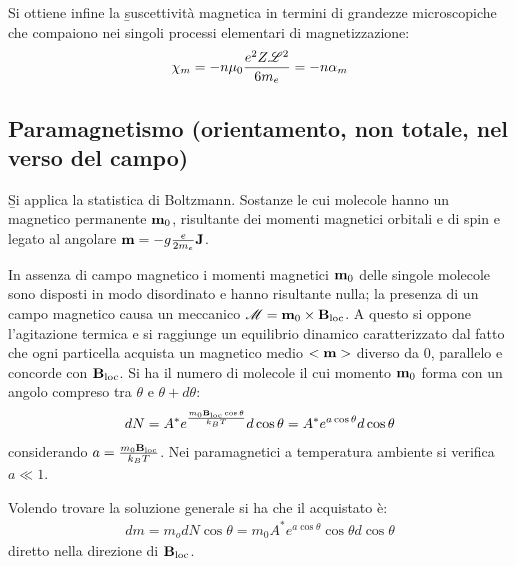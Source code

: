 Si ottiene infine la \b{suscettività magnetica in termini di grandezze microscopiche} che compaiono nei singoli processi elementari di magnetizzazione:
\begin{equation}\begin{split}
\chi_m=-n\mu_0\frac{e^2Z\mathcal{L}^2}{6m_e}=-n\alpha_m
\end{split}\end{equation}

\subsection{Paramagnetismo (orientamento, non totale, nel verso del campo)}
\b{Si applica la statistica di Boltzmann}. Sostanze le cui molecole hanno un \mom magnetico permanente $\mathbf{m}_0$, risultante dei momenti magnetici orbitali e di spin e legato al \mom angolare $\mathbf{m}=-g\frac{e}{2m_e}\mathbf{J}$.

In assenza di campo magnetico i momenti magnetici $\mathbf{m}_0$ delle singole molecole sono disposti in modo disordinato e hanno risultante nulla; la presenza di un campo magnetico causa un \mom meccanico $\mathcal{M}=\mathbf{m}_0\times\mathbf{B}_{\textrm{loc}}$. A questo si oppone l'agitazione termica e si raggiunge un equilibrio dinamico caratterizzato dal fatto che ogni particella acquista un \mom magnetico medio $<\mathbf{m}>$ diverso da 0, parallelo e concorde con $\mathbf{B}_{\textrm{loc}}$. Si ha il numero di molecole il cui momento $\mathbf{m}_0$ forma con \dBl un angolo compreso tra $\theta$ e $\theta+d\theta$:
\begin{equation}\begin{split}
dN=A^*e^{\frac{m_0\mathbf{B}_{\textrm{loc}}\cos{\theta}}{k_BT}}d\cos{\theta}=A^*e^{a\cos{\theta}}d\cos{\theta}
\end{split}\end{equation}
considerando $a=\frac{m_0\mathbf{B}_{\textrm{loc}}}{k_BT}$. Nei paramagnetici a temperatura ambiente si verifica $a\ll 1$.

Volendo trovare la soluzione generale si ha che il \mom acquistato è:
\begin{equation}\begin{split}
dm=m_odN\cos{\theta}=m_0A^*e^{a\cos{\theta}}\cos{\theta}d\cos{\theta}
\end{split}\end{equation}
diretto nella direzione di $\mathbf{B}_{\textrm{loc}}$.

